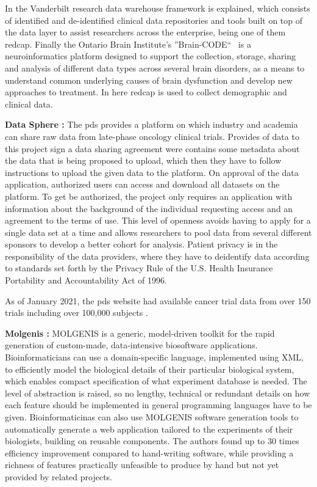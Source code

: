 In \cite{vanderbilt} the Vanderbilt research data warehouse framework is explained,
which consists of identified and de-identified clinical data repositories and tools
built on top of the data layer to assist researchers across the enterprise, being one
of them \gls{redcap}.
Finally the Ontario Brain Institute’s ''Brain-CODE``~\cite{braincode} is a
neuroinformatics platform designed to support the collection, storage, sharing and
analysis of different data types across several brain disorders, as a means to
understand common underlying causes of brain dysfunction and develop new approaches to
treatment.
In here \gls{redcap} is used to collect demographic and clinical data.

\textbf{Data Sphere \cite{datasphere}:}
The \gls{pds} provides a platform on which industry and academia can share
raw data from late-phase oncology clinical trials.
Provides of data to this project sign a data sharing agreement were contains some
metadata about the data that is being proposed to upload, which then they have to
follow instructions to upload the given data to the platform.
On approval of the data application, authorized users can access and download all
datasets on the platform.
To get be authorized, the project only requires an application with information about
the background of the individual requesting access and an agreement to the terms of
use.
This level of openness avoids having to apply for a single data set at a time and
allows researchers to pool data from several different sponsors to develop a better
cohort for analysis.
Patient privacy is in the responsibility of the data providers, where they have to
deidentify data according to standards set forth by the Privacy Rule of the U.S. Health
Insurance Portability and Accountability Act of 1996.

As of January 2021, the \gls{pds} website had available cancer trial data from over 150
trials including over 100,000 subjects \cite{datasphere-site}.

\textbf{Molgenis \cite{molgenis}:}
MOLGENIS is a generic, model-driven toolkit for the rapid generation of custom-made,
data-intensive biosoftware applications.
Bioinformaticians can use a domain-specific language, implemented using XML, to
efficiently model the biological details of their particular biological system, which
enables compact specification of what experiment database is needed.
The level of abstraction is raised, so no lengthy, technical or redundant details on
how each feature should be implemented in general programming languages have to be
given.
Bioinformaticinas can also use MOLGENIS software generation tools to automatically
generate a web application tailored to the experiments of their biologists, building on
reusable components.
The authors found up to 30 times efficiency improvement compared to hand-writing
software, while providing a richness of features practically unfeasible to produce by
hand but not yet provided by related projects.

